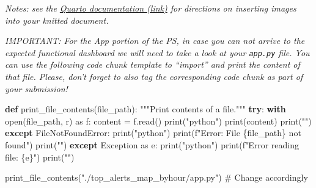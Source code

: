 \documentclass[
  letterpaper,
  DIV=11,
  numbers=noendperiod]{scrartcl}
\newenvironment{Shaded}{\begin{snugshade}}{\end{snugshade}}
\newcommand{\BuiltInTok}[1]{\textcolor[rgb]{0.00,0.23,0.31}{#1}}
\newcommand{\CommentTok}[1]{\textcolor[rgb]{0.37,0.37,0.37}{#1}}
\newcommand{\ControlFlowTok}[1]{\textcolor[rgb]{0.00,0.23,0.31}{\textbf{#1}}}
\newcommand{\ImportTok}[1]{\textcolor[rgb]{0.00,0.46,0.62}{#1}}
\newcommand{\KeywordTok}[1]{\textcolor[rgb]{0.00,0.23,0.31}{\textbf{#1}}}
\newcommand{\NormalTok}[1]{\textcolor[rgb]{0.00,0.23,0.31}{#1}}
\newcommand{\OperatorTok}[1]{\textcolor[rgb]{0.37,0.37,0.37}{#1}}
\newcommand{\PreprocessorTok}[1]{\textcolor[rgb]{0.68,0.00,0.00}{#1}}
\newcommand{\SpecialCharTok}[1]{\textcolor[rgb]{0.37,0.37,0.37}{#1}}
\newcommand{\SpecialStringTok}[1]{\textcolor[rgb]{0.13,0.47,0.30}{#1}}
\newcommand{\StringTok}[1]{\textcolor[rgb]{0.13,0.47,0.30}{#1}}
\begin{document}
\emph{Notes: see the
\href{https://quarto.org/docs/authoring/figures.html}{Quarto
documentation (link)} for directions on inserting images into your
knitted document.}

\emph{IMPORTANT: For the App portion of the PS, in case you can not
arrive to the expected functional dashboard we will need to take a look
at your \texttt{app.py} file. You can use the following code chunk
template to ``import'' and print the content of that file. Please, don't
forget to also tag the corresponding code chunk as part of your
submission!}

\begin{Shaded}
\begin{Highlighting}[]
\KeywordTok{def}\NormalTok{ print\_file\_contents(file\_path):}
    \CommentTok{"""Print contents of a file."""}
    \ControlFlowTok{try}\NormalTok{:}
        \ControlFlowTok{with} \BuiltInTok{open}\NormalTok{(file\_path, }\StringTok{\textquotesingle{}r\textquotesingle{}}\NormalTok{) }\ImportTok{as}\NormalTok{ f:}
\NormalTok{            content }\OperatorTok{=}\NormalTok{ f.read()}
            \BuiltInTok{print}\NormalTok{(}\StringTok{"\textasciigrave{}\textasciigrave{}\textasciigrave{}python"}\NormalTok{)}
            \BuiltInTok{print}\NormalTok{(content)}
            \BuiltInTok{print}\NormalTok{(}\StringTok{"\textasciigrave{}\textasciigrave{}\textasciigrave{}"}\NormalTok{)}
    \ControlFlowTok{except} \PreprocessorTok{FileNotFoundError}\NormalTok{:}
        \BuiltInTok{print}\NormalTok{(}\StringTok{"\textasciigrave{}\textasciigrave{}\textasciigrave{}python"}\NormalTok{)}
        \BuiltInTok{print}\NormalTok{(}\SpecialStringTok{f"Error: File \textquotesingle{}}\SpecialCharTok{\{}\NormalTok{file\_path}\SpecialCharTok{\}}\SpecialStringTok{\textquotesingle{} not found"}\NormalTok{)}
        \BuiltInTok{print}\NormalTok{(}\StringTok{"\textasciigrave{}\textasciigrave{}\textasciigrave{}"}\NormalTok{)}
    \ControlFlowTok{except} \PreprocessorTok{Exception} \ImportTok{as}\NormalTok{ e:}
        \BuiltInTok{print}\NormalTok{(}\StringTok{"\textasciigrave{}\textasciigrave{}\textasciigrave{}python"}\NormalTok{) }
        \BuiltInTok{print}\NormalTok{(}\SpecialStringTok{f"Error reading file: }\SpecialCharTok{\{}\NormalTok{e}\SpecialCharTok{\}}\SpecialStringTok{"}\NormalTok{)}
        \BuiltInTok{print}\NormalTok{(}\StringTok{"\textasciigrave{}\textasciigrave{}\textasciigrave{}"}\NormalTok{)}

\NormalTok{print\_file\_contents(}\StringTok{"./top\_alerts\_map\_byhour/app.py"}\NormalTok{) }\CommentTok{\# Change accordingly}
\end{Highlighting}
\end{Shaded}
\end{document}
